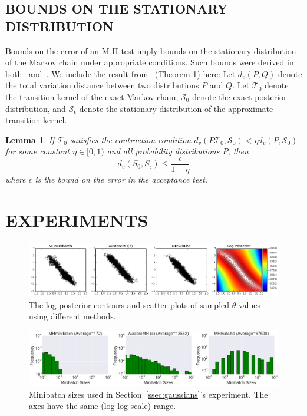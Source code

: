\documentclass[letterpaper]{article}
\newtheorem{lemma}{Lemma}
\begin{document}
\subsection{BOUNDS ON THE STATIONARY DISTRIBUTION}
Bounds on the error of an M-H test imply bounds on the stationary distribution
of the Markov chain under appropriate conditions. Such bounds were derived in
both~\citep{cutting_mh_2014} and~\citep{icml2014c1_bardenet14}. We include the
result from~\citep{cutting_mh_2014} (Theorem 1) here: Let $d_v(P,Q)$ denote the
total variation distance between two distributions $P$ and $Q$.  Let
$\mathcal{T}_0$ denote the transition kernel of the exact Markov chain,
$\mathcal{S}_0$ denote the exact posterior distribution, and
$\mathcal{S}_{\epsilon}$ denote the stationary distribution of the approximate
transition kernel. 
\begin{lemma}
If $\mathcal{T}_0$ satisfies the contraction condition
$d_v(P\mathcal{T}_0,\mathcal{S}_0) < \eta d_v(P,\mathcal{S}_0)$ for some
constant $\eta\in [0,1)$ and all probability distributions $P$, then
\begin{equation}
      d_v(S_0, S_{\epsilon}) \leq\frac{\epsilon}{1-\eta}
\end{equation}
where $\epsilon$ is the bound on the error in the acceptance test. 
\end{lemma}





\section{EXPERIMENTS}\label{sec:experiments}

\begin{figure}[t]
    \centering
    \includegraphics[width=1.0\linewidth]{gaussian_mixture_scatter_results_v8.png}
    \caption{
    The log posterior contours and scatter plots of sampled $\theta$ values
    using different methods. 
    }
    \label{fig:gauss_mix_1}
\end{figure}
\begin{figure}[t]
    \centering
    \includegraphics[width=0.9\linewidth]{gaussian_mixture_histogram_results_v8.png}
    \caption{
    Minibatch sizes used in Section~\ref{ssec:gaussians}'s experiment. The axes
    have the same (log-log scale) range.
    }
    \label{fig:gauss_mix_2}
\end{figure}
\end{document}
